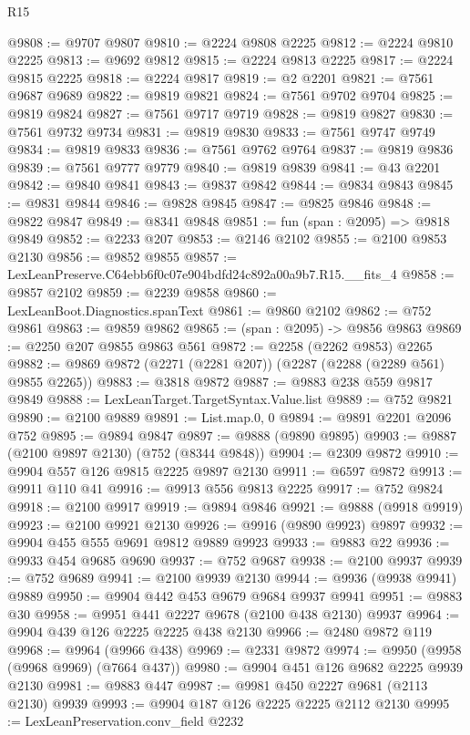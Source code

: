 \begin{lexlean}{R15}
\begin{coremodule}
@9808 := @9707 @9807
@9810 := @2224 @9808 @2225
@9812 := @2224 @9810 @2225
@9813 := @9692 @9812
@9815 := @2224 @9813 @2225
@9817 := @2224 @9815 @2225
@9818 := @2224 @9817
@9819 := @2 @2201
@9821 := @7561 @9687 @9689
@9822 := @9819 @9821
@9824 := @7561 @9702 @9704
@9825 := @9819 @9824
@9827 := @7561 @9717 @9719
@9828 := @9819 @9827
@9830 := @7561 @9732 @9734
@9831 := @9819 @9830
@9833 := @7561 @9747 @9749
@9834 := @9819 @9833
@9836 := @7561 @9762 @9764
@9837 := @9819 @9836
@9839 := @7561 @9777 @9779
@9840 := @9819 @9839
@9841 := @43 @2201
@9842 := @9840 @9841
@9843 := @9837 @9842
@9844 := @9834 @9843
@9845 := @9831 @9844
@9846 := @9828 @9845
@9847 := @9825 @9846
@9848 := @9822 @9847
@9849 := @8341 @9848
@9851 := fun (span : @2095) => @9818 @9849
@9852 := @2233 @207
@9853 := @2146 @2102
@9855 := @2100 @9853 @2130
@9856 := @9852 @9855
@9857 := LexLeanPreserve.C64ebb6f0c07e904bdfd24c892a00a9b7.R15.__fits_4
@9858 := @9857 @2102
@9859 := @2239 @9858
@9860 := LexLeanBoot.Diagnostics.spanText
@9861 := @9860 @2102
@9862 := @752 @9861
@9863 := @9859 @9862
@9865 := (span : @2095) -> @9856 @9863
@9869 := @2250 @207 @9855 @9863 @561
@9872 := @2258 (@2262 @9853) @2265
@9882 := @9869 @9872 (@2271 (@2281 @207)) (@2287 (@2288 (@2289 @561) @9855 @2265))
@9883 := @3818 @9872
@9887 := @9883 @238 @559 @9817 @9849
@9888 := LexLeanTarget.TargetSyntax.Value.list
@9889 := @752 @9821
@9890 := @2100 @9889
@9891 := List.map.{0, 0}
@9894 := @9891 @2201 @2096 @752
@9895 := @9894 @9847
@9897 := @9888 (@9890 @9895)
@9903 := @9887 (@2100 @9897 @2130) (@752 (@8344 @9848))
@9904 := @2309 @9872
@9910 := @9904 @557 @126 @9815 @2225 @9897 @2130
@9911 := @6597 @9872
@9913 := @9911 @110 @41
@9916 := @9913 @556 @9813 @2225
@9917 := @752 @9824
@9918 := @2100 @9917
@9919 := @9894 @9846
@9921 := @9888 (@9918 @9919)
@9923 := @2100 @9921 @2130
@9926 := @9916 (@9890 @9923) @9897
@9932 := @9904 @455 @555 @9691 @9812 @9889 @9923
@9933 := @9883 @22
@9936 := @9933 @454 @9685 @9690
@9937 := @752 @9687
@9938 := @2100 @9937
@9939 := @752 @9689
@9941 := @2100 @9939 @2130
@9944 := @9936 (@9938 @9941) @9889
@9950 := @9904 @442 @453 @9679 @9684 @9937 @9941
@9951 := @9883 @30
@9958 := @9951 @441 @2227 @9678 (@2100 @438 @2130) @9937
@9964 := @9904 @439 @126 @2225 @2225 @438 @2130
@9966 := @2480 @9872 @119
@9968 := @9964 (@9966 @438)
@9969 := @2331 @9872
@9974 := @9950 (@9958 (@9968 @9969) (@7664 @437))
@9980 := @9904 @451 @126 @9682 @2225 @9939 @2130
@9981 := @9883 @447
@9987 := @9981 @450 @2227 @9681 (@2113 @2130) @9939
@9993 := @9904 @187 @126 @2225 @2225 @2112 @2130
@9995 := LexLeanPreservation.conv_field @2232

\end{coremodule}
\end{lexlean}
